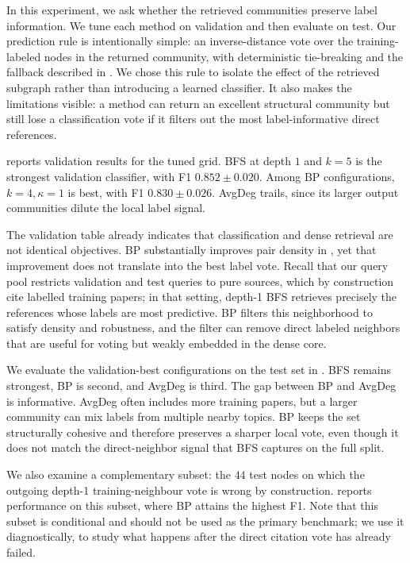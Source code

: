 \documentclass[12pt]{article}
\begin{document}
In this experiment, we ask whether the retrieved communities preserve label information.  We tune each method on validation and then evaluate on test.  Our prediction rule is intentionally simple: an inverse-distance vote over the training-labeled nodes in the returned community, with deterministic tie-breaking and the fallback described in .  We chose this rule to isolate the effect of the retrieved subgraph rather than introducing a learned classifier.  It also makes the limitations visible: a method can return an excellent structural community but still lose a classification vote if it filters out the most label-informative direct references.

 reports validation results for the tuned grid.  BFS at depth $1$ and $k=5$ is the strongest validation classifier, with F1 $0.852\pm0.020$.  Among BP configurations, $k=4,\kappa=1$ is best, with F1 $0.830\pm0.026$.  AvgDeg trails, since its larger output communities dilute the local label signal.



The validation table already indicates that classification and dense retrieval are not identical objectives.  BP substantially improves pair density in , yet that improvement does not translate into the best label vote.  Recall that our query pool restricts validation and test queries to pure sources, which by construction cite labelled training papers; in that setting, depth-1 BFS retrieves precisely the references whose labels are most predictive.  BP filters this neighborhood to satisfy density and robustness, and the filter can remove direct labeled neighbors that are useful for voting but weakly embedded in the dense core.

We evaluate the validation-best configurations on the test set in .  BFS remains strongest, BP is second, and AvgDeg is third.  The gap between BP and AvgDeg is informative.  AvgDeg often includes more training papers, but a larger community can mix labels from multiple nearby topics.  BP keeps the set structurally cohesive and therefore preserves a sharper local vote, even though it does not match the direct-neighbor signal that BFS captures on the full split.



We also examine a complementary subset: the $44$ test nodes on which the outgoing depth-1 training-neighbour vote is wrong by construction.   reports performance on this subset, where BP attains the highest F1.  Note that this subset is conditional and should not be used as the primary benchmark; we use it diagnostically, to study what happens after the direct citation vote has already failed.
\end{document}
